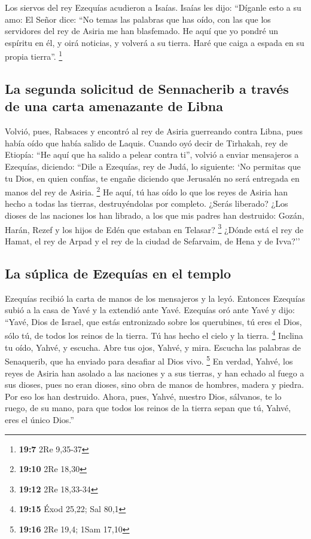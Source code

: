  Los siervos del rey Ezequías acudieron a Isaías.
 Isaías les dijo: ``Díganle esto a su amo: El Señor dice:
``No temas las palabras que has oído, con las que los servidores del rey
de Asiria me han blasfemado.  He aquí que yo pondré un
espíritu en él, y oirá noticias, y volverá a su tierra. Haré que caiga a
espada en su propia tierra''. \footnote{\textbf{19:7} 2Re 9,35-37}

\hypertarget{la-segunda-solicitud-de-sennacherib-a-travuxe9s-de-una-carta-amenazante-de-libna}{%
\subsection{La segunda solicitud de Sennacherib a través de una carta
amenazante de
Libna}\label{la-segunda-solicitud-de-sennacherib-a-travuxe9s-de-una-carta-amenazante-de-libna}}

 Volvió, pues, Rabsaces y encontró al rey de Asiria
guerreando contra Libna, pues había oído que había salido de Laquis.
 Cuando oyó decir de Tirhakah, rey de Etiopía: ``He aquí
que ha salido a pelear contra ti'', volvió a enviar mensajeros a
Ezequías, diciendo:  ``Dile a Ezequías, rey de Judá, lo
siguiente: `No permitas que tu Dios, en quien confías, te engañe
diciendo que Jerusalén no será entregada en manos del rey de Asiria.
\footnote{\textbf{19:10} 2Re 18,30}  He aquí, tú has oído
lo que los reyes de Asiria han hecho a todas las tierras, destruyéndolas
por completo. ¿Serás liberado?  ¿Los dioses de las
naciones los han librado, a los que mis padres han destruido: Gozán,
Harán, Rezef y los hijos de Edén que estaban en Telasar? \footnote{\textbf{19:12}
  2Re 18,33-34}  ¿Dónde está el rey de Hamat, el rey de
Arpad y el rey de la ciudad de Sefarvaim, de Hena y de Ivva?''

\hypertarget{la-suxfaplica-de-ezequuxedas-en-el-templo}{%
\subsection{La súplica de Ezequías en el
templo}\label{la-suxfaplica-de-ezequuxedas-en-el-templo}}

 Ezequías recibió la carta de manos de los mensajeros y
la leyó. Entonces Ezequías subió a la casa de Yavé y la extendió ante
Yavé.  Ezequías oró ante Yavé y dijo: ``Yavé, Dios de
Israel, que estás entronizado sobre los querubines, tú eres el Dios,
sólo tú, de todos los reinos de la tierra. Tú has hecho el cielo y la
tierra. \footnote{\textbf{19:15} Éxod 25,22; Sal 80,1} 
Inclina tu oído, Yahvé, y escucha. Abre tus ojos, Yahvé, y mira. Escucha
las palabras de Senaquerib, que ha enviado para desafiar al Dios vivo.
\footnote{\textbf{19:16} 2Re 19,4; 1Sam 17,10}  En
verdad, Yahvé, los reyes de Asiria han asolado a las naciones y a sus
tierras,  y han echado al fuego a sus dioses, pues no
eran dioses, sino obra de manos de hombres, madera y piedra. Por eso los
han destruido.  Ahora, pues, Yahvé, nuestro Dios,
sálvanos, te lo ruego, de su mano, para que todos los reinos de la
tierra sepan que tú, Yahvé, eres el único Dios.''

